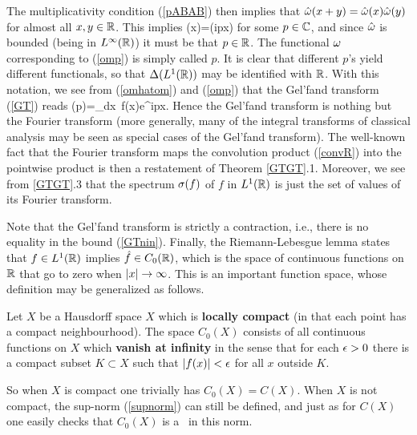 The multiplicativity condition (\ref{pABAB}) then implies that
$\hat{\omega}(x+y)=\hat{\omega}(x)\hat{\omega}(y)$ for almost all $x,y\in{\Bbb R}$.
This implies \be \hat{\om}(x)=\exp(ipx)  \ee for some
$p\in{\Bbb C}$, and since $\hat{\omega}$ is bounded (being in $L^{\infty}({\Bbb R})$)
it must be that $p\in{\Bbb R}$. The functional $\omega$ corresponding to
(\ref{omp}) is simply called $p$. It is clear that different $p$'s
yield different functionals, so that $\Delta(L^1({\Bbb R}))$ may be identified
with ${\Bbb R}$. With this notation, we see from (\ref{omhatom}) and
(\ref{omp}) that the Gel'fand transform (\ref{GT}) reads \be
{}(p)=\int_{\R}dx\, f(x)e^{ipx}.  \ee Hence the Gel'fand
transform is nothing but the Fourier transform (more generally, many
of the integral transforms of classical analysis may be seen as
special cases of the Gel'fand transform).  The well-known fact that
the Fourier transform maps the convolution product (\ref{convR}) into
the pointwise product is then a restatement of Theorem
\ref{GTGT}.1. Moreover, we see from \ref{GTGT}.3 that the spectrum
$\sigma(f)$ of $f$ in $L^1({\Bbb R})$ is just the set of values of its Fourier
transform.

Note that the Gel'fand transform is strictly a contraction, i.e.,
there is no equality in the bound (\ref{GTnin}). Finally, the
Riemann-Lebesgue lemma states that $f\in L^1({\Bbb R})$ implies $\hat{f}\in
C_0({\Bbb R})$, which is the space of continuous functions on ${\Bbb R}$ that go
to zero when $|x|\rightarrow\infty$.  This is an important function space,
whose definition may be generalized as follows.
\begin{Definition}
Let $X$ be a Hausdorff space $X$ which is {\bf locally compact} (in
that each point has a compact neighbourhood).  The space $C_0(X)$
consists of all continuous functions on $X$ which {\bf vanish at
infinity} in the sense that for each $\epsilon>0$ there is a compact subset
$K\subset X$ such that $|f(x)|<\epsilon$ for all $x$ outside
$K$. \end{Definition}

So when $X$ is compact one trivially has $C_0(X)=C(X)$.  When $X$ is
not compact, the sup-norm (\ref{supnorm}) can still be defined, and
just as for $C(X)$ one easily checks that $C_0(X)$ is a \BA\ in this
norm.

